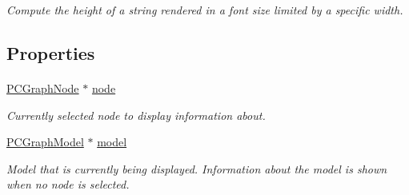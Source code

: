 \begin{Indent}
\begin{DoxyCompactItemize}
\begin{DoxyCompactList}\small\item\em Compute the height of a string rendered in a font size limited by a specific width. \end{DoxyCompactList}\end{DoxyCompactItemize}
\end{Indent}
\subsection*{Properties}
\paragraph*{}
\begin{DoxyCompactItemize}
\item 
\hypertarget{interface_p_c_node_info_view_controller_af93ce8d160f66e92ef852eb23d535c5d}{
\hyperlink{interface_p_c_graph_node}{PCGraphNode} $\ast$ \hyperlink{interface_p_c_node_info_view_controller_af93ce8d160f66e92ef852eb23d535c5d}{node}}
\label{interface_p_c_node_info_view_controller_af93ce8d160f66e92ef852eb23d535c5d}

\begin{DoxyCompactList}\small\item\em Currently selected node to display information about. \end{DoxyCompactList}\item 
\hypertarget{interface_p_c_node_info_view_controller_aa16effad5ef43133b9d82207bba806d3}{
\hyperlink{interface_p_c_graph_model}{PCGraphModel} $\ast$ \hyperlink{interface_p_c_node_info_view_controller_aa16effad5ef43133b9d82207bba806d3}{model}}
\label{interface_p_c_node_info_view_controller_aa16effad5ef43133b9d82207bba806d3}

\begin{DoxyCompactList}\small\item\em Model that is currently being displayed. Information about the model is shown when no node is selected. \end{DoxyCompactList}\end{DoxyCompactItemize}

